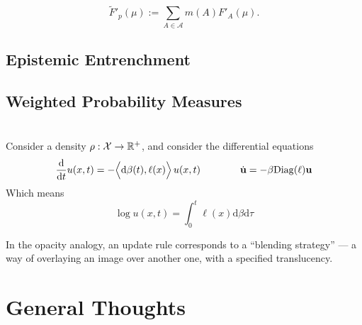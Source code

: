 \documentclass{article}
\begin{document}
\[
    \tilde F'_p(\mu) := \sum_{A \in \mathcal A} m(A) F'_{A}(\mu).
\]




\subsection{Epistemic Entrenchment}
\subsection{Weighted Probability Measures}

\section{}
Consider a density $\rho : \mathcal X \to \mathbb R^+$, and consider the differential equations
\[
    \frac{\mathrm d}{\mathrm d t} u(x,t)
    = - \Big\langle\mathrm d\beta(t), \ell(x) \Big\rangle
        \,
        {u(x,t)}
    \qquad\qquad%
    \dot {\mat u} = - \beta \mathrm{Diag}(\ell) \mat u
\]
Which means
\[
        \log u (x,t)
    = \int_{0}^{t}  \ell(x) \mathrm d \beta \mathrm d \tau
\]














In the opacity analogy, an update rule corresponds to a ``blending strategy'' --- a way of overlaying an image over another one, with a specified translucency.


\newpage
\printbibliography


\appendix
\section{General Thoughts}
\end{document}
